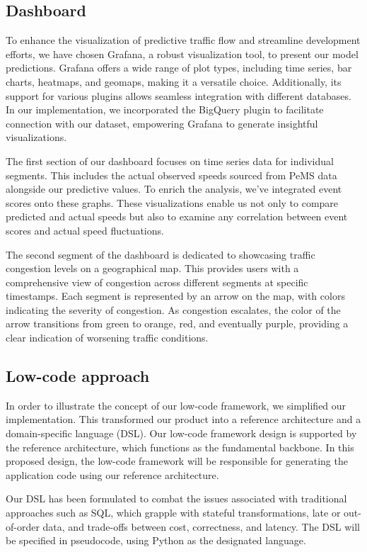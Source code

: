 \subsection{Dashboard}
To enhance the visualization of predictive traffic flow and streamline development efforts, we have chosen Grafana, a robust visualization tool, to present our model predictions. Grafana offers a wide range of plot types, including time series, bar charts, heatmaps, and geomaps, making it a versatile choice. Additionally, its support for various plugins allows seamless integration with different databases. In our implementation, we incorporated the BigQuery plugin to facilitate connection with our dataset, empowering Grafana to generate insightful visualizations.

The first section of our dashboard focuses on time series data for individual segments. This includes the actual observed speeds sourced from PeMS data alongside our predictive values. To enrich the analysis, we've integrated event scores onto these graphs. These visualizations enable us not only to compare predicted and actual speeds but also to examine any correlation between event scores and actual speed fluctuations.

The second segment of the dashboard is dedicated to showcasing traffic congestion levels on a geographical map. This provides users with a comprehensive view of congestion across different segments at specific timestamps. Each segment is represented by an arrow on the map, with colors indicating the severity of congestion. As congestion escalates, the color of the arrow transitions from green to orange, red, and eventually purple, providing a clear indication of worsening traffic conditions.
 

\subsection{Low-code approach}
In order to illustrate the concept of our low-code framework, we simplified our implementation. This transformed our product into a reference architecture and a domain-specific language (DSL). Our low-code framework design is supported by the reference architecture, which functions as the fundamental backbone. In this proposed design, the low-code framework will be responsible for generating the application code using our reference architecture. 

Our DSL has been formulated to combat the issues associated with traditional approaches such as SQL, which grapple with stateful transformations, late or out-of-order data, and trade-offs between cost, correctness, and latency. The DSL will be specified in pseudocode, using Python as the designated language. 


